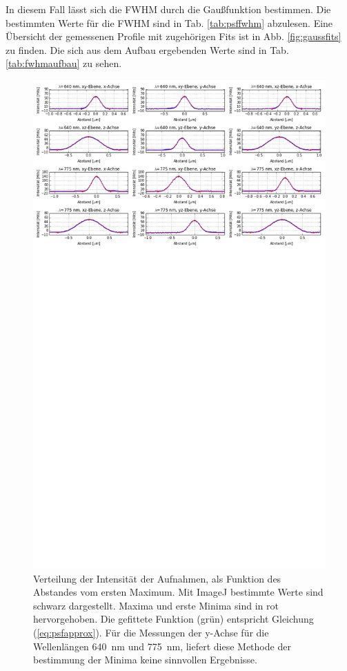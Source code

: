 In diesem Fall lässt sich die FWHM durch die Gaußfunktion bestimmen.
Die bestimmten Werte für die FWHM sind in Tab. \ref{tab:psffwhm} abzulesen. Eine Übersicht der gemessenen Profile mit zugehörigen Fits ist in Abb. \ref{fig:gaussfits} zu finden.
Die sich aus dem Aufbau ergebenden Werte sind in Tab. \ref{tab:fwhmaufbau} zu sehen.
\begin{figure}
	\centering
	\includegraphics[trim= 0 950 0 0, width=\textwidth]{plots/goldbeads.png}
	\caption{Verteilung der Intensität der Aufnahmen, als Funktion des Abstandes vom ersten Maximum. Mit ImageJ bestimmte Werte sind schwarz dargestellt. 
		Maxima und erste Minima sind in rot hervorgehoben. 
		Die gefittete Funktion (grün) entspricht Gleichung (\ref{eq:psfapprox}). 
		Für die Messungen der y-Achse für die Wellenlängen 640~nm und 775~nm, liefert diese Methode der bestimmung der Minima keine sinnvollen Ergebnisse.
	}\label{fig:psffits}
\end{figure}
